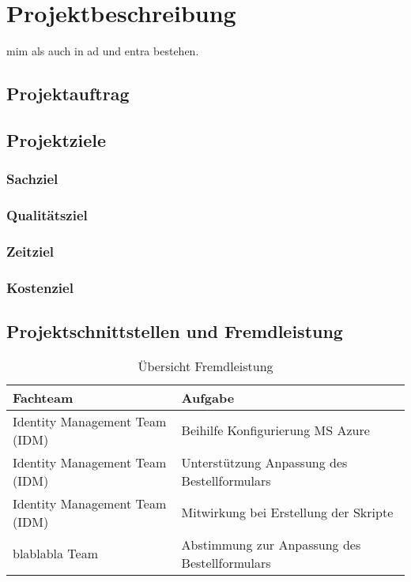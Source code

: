 \chapter{Projektbeschreibung}
\lipsum[1]
\gls{mim} als auch in \gls{ad} und \gls{entra} bestehen.

\section{Projektauftrag}
\lipsum[1]

\section{Projektziele}
\subsection{Sachziel}
\lipsum[1]

\subsection{Qualitätsziel}
\lipsum[1]

\subsection{Zeitziel}
\lipsum[1]

\subsection{Kostenziel}
\lipsum[1]

\noindent \lipsum[1]

\noindent \lipsum[1]
\clearpage

\section{Projektschnittstellen und Fremdleistung}
\lipsum[1]


\begin{table}[H]
    \centering
\begin{tabular}{|  >{\centering\arraybackslash}m{7cm} | m{7cm} |}
  \hline
  \rowcolor{gray!40}
  Fachteam & Aufgabe \\
  \hline
  Identity Management Team (IDM) & Beihilfe Konfigurierung MS Azure \\
  \hline
  Identity Management Team (IDM) & Unterstützung Anpassung des Bestellformulars \\
  \hline
  Identity Management Team (IDM) & Mitwirkung bei Erstellung der Skripte \\
  \hline
  blablabla Team & Abstimmung zur Anpassung des Bestellformulars \\
  \hline
\end{tabular}
    \caption{Übersicht Fremdleistung}
    \label{tab:Übersicht Fremdleistung}
\end{table} 

